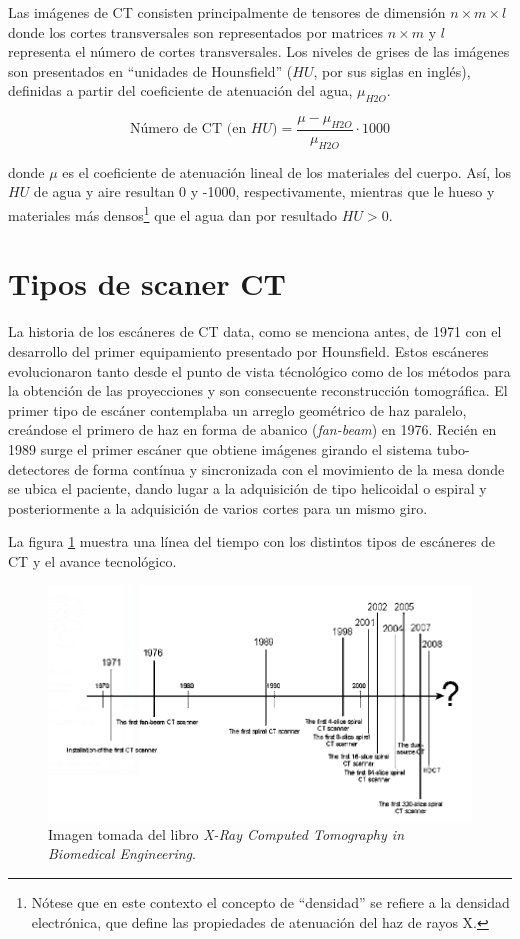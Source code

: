 Las imágenes de CT consisten principalmente de tensores de dimensión $n\times m \times l$ donde los cortes transversales son representados por matrices $n\times m$ y $l$ representa el número de cortes transversales. Los niveles de grises de las imágenes son presentados en ``unidades de Hounsfield'' ($HU$, por sus siglas en inglés), definidas a partir del coeficiente de atenuación del agua, $\mu_{H2O}$.

\begin{equation}
 \text{Número de CT (en $HU$)} = \frac{\mu - \mu_{H2O}}{\mu_{H2O}} \cdot 1000
\end{equation}

\noindent
donde $\mu$ es el coeficiente de atenuación lineal de los materiales del cuerpo. Así, los $HU$ de agua y aire resultan 0 y -1000, respectivamente, mientras que le hueso y materiales más densos\footnote{Nótese que en este contexto el concepto de ``densidad'' se refiere a la densidad electrónica, que define las propiedades de atenuación del haz de rayos X.} que el agua dan por resultado $HU > 0$.

\section{Tipos de scaner CT}

La historia de los escáneres de CT data, como se menciona antes, de 1971 con el desarrollo del primer equipamiento presentado por Hounsfield. Estos escáneres evolucionaron tanto desde el punto de vista técnológico como de los métodos para la obtención de las proyecciones y son consecuente reconstrucción tomográfica. El primer tipo de escáner contemplaba un arreglo geométrico de haz paralelo, creándose el primero de haz en forma de abanico (\emph{fan-beam}) en 1976. Recién en 1989 surge el primer escáner que obtiene imágenes girando el sistema tubo-detectores de forma contínua y sincronizada con el movimiento de la mesa donde se ubica el paciente, dando lugar a la adquisición de tipo helicoidal o espiral y posteriormente a la adquisición de varios cortes para un mismo giro.

La figura \ref{fig:10-0.1} muestra una línea del tiempo con los distintos tipos de escáneres de CT y el avance tecnológico.

\begin{figure}
 \centering
 \includegraphics[width=.75\textwidth]{figures/fig10-01.png}
 \caption{Imagen tomada del libro \emph{X-Ray Computed Tomography in Biomedical Engineering}.}
 \label{fig:10-0.1}
\end{figure}

